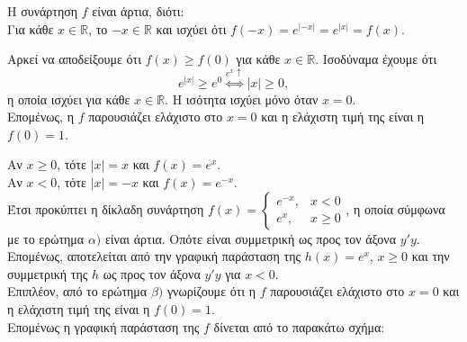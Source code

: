 \begin{alist}
\item Η συνάρτηση $f$ είναι άρτια, διότι: \\
Για κάθε $x \in \mathbb{R}$, το $-x \in \mathbb{R}$ και ισχύει ότι $f(-x) = e^{|-x|} = e^{|x|} = f(x)$.
\item Αρκεί να αποδείξουμε ότι $f(x) \ge f(0)$ για κάθε $x \in \mathbb{R}$. Ισοδύναμα έχουμε ότι
\[e^{|x|} \ge e^0 \overset{e^x \uparrow}{\Longleftrightarrow} |x| \ge 0,\]
η οποία ισχύει για κάθε $x \in \mathbb{R}$. Η ισότητα ισχύει μόνο όταν $x = 0$. \\
Επομένως, η $f$ παρουσιάζει ελάχιστο στο $x=0$ και η ελάχιστη τιμή της είναι η $f(0) = 1$.
\item Αν $x \ge 0$, τότε $|x| = x$ και $f(x) = e^x$. \\
Αν $x < 0$, τότε $|x| = -x$ και $f(x) = e^{-x}$. \\
Έτσι προκύπτει η δίκλαδη συνάρτηση $f(x) = \begin{cases} e^{-x}, & x < 0 \\ e^x, & x \ge 0 \end{cases}$, η οποία σύμφωνα με το ερώτημα $\alpha)$ είναι άρτια. Οπότε είναι συμμετρική ως προς τον άξονα $y'y$. \\
Επομένως, αποτελείται από την γραφική παράσταση της $h(x) = e^x$, $x \ge 0$ και την συμμετρική της $h$ ως προς τον άξονα $y'y$ για $x < 0$. \\
Επιπλέον, από το ερώτημα $\beta)$ γνωρίζουμε ότι η $f$ παρουσιάζει ελάχιστο στο $x=0$ και η ελάχιστη τιμή της είναι η $f(0) = 1$. \\
Επομένως η γραφική παράσταση της $f$ δίνεται από το παρακάτω σχήμα:
\begin{center}
\end{center}
\end{alist}

